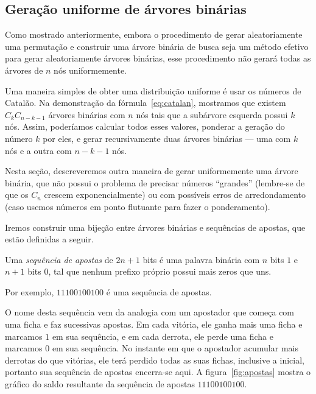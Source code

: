 \subsection{Geração uniforme de árvores binárias}

Como mostrado anteriormente,
embora o procedimento de gerar aleatoriamente uma permutação
e construir uma árvore binária de busca
seja um método efetivo para gerar aleatoriamente árvores binárias,
esse procedimento não gerará todas as árvores de $n$ nós uniformemente.

Uma maneira simples de obter uma distribuição uniforme
é usar os números de Catalão.
Na demonstração da fórmula~\ref{eq:catalan},
mostramos que existem $C_k C_{n-k-1}$ árvores binárias com $n$ nós
tais que a subárvore esquerda possui $k$ nós.
Assim,
poderíamos calcular todos esses valores,
ponderar a geração do número $k$ por eles,
e gerar recursivamente duas árvores binárias
--- uma com $k$ nós e a outra com $n - k - 1$ nós.

Nesta seção,
descreveremos outra maneira de gerar uniformemente uma árvore binária,
que não possui o problema de precisar números ``grandes''
(lembre-se de que os $C_n$ crescem exponencialmente)
ou com possíveis erros de arredondamento
(caso usemos números em ponto flutuante para fazer o ponderamento).

Iremos construir uma bijeção entre árvores binárias e sequências de apostas,
que estão definidas a seguir.

\begin{definition}
    Uma \emph{sequência de apostas} de $2n+1$ bits
    é uma palavra binária com $n$ bits $1$ e $n+1$ bits $0$,
    tal que
    nenhum prefixo próprio possui mais zeros que uns.
\end{definition}

Por exemplo, $11100100100$ é uma sequência de apostas.

O nome desta sequência vem da analogia com um apostador
que começa com uma ficha e faz sucessivas apostas.
Em cada vitória, ele ganha mais uma ficha e marcamos $1$ em sua sequência,
e em cada derrota, ele perde uma ficha e marcamos $0$ em sua sequência.
No instante em que o apostador acumular mais derrotas do que vitórias,
ele terá perdido todas as suas fichas, inclusive a inicial,
portanto sua sequência de apostas encerra-se aqui.
A figura~\ref{fig:apostas}
mostra o gráfico do saldo resultante da sequência de apostas $11100100100$.

